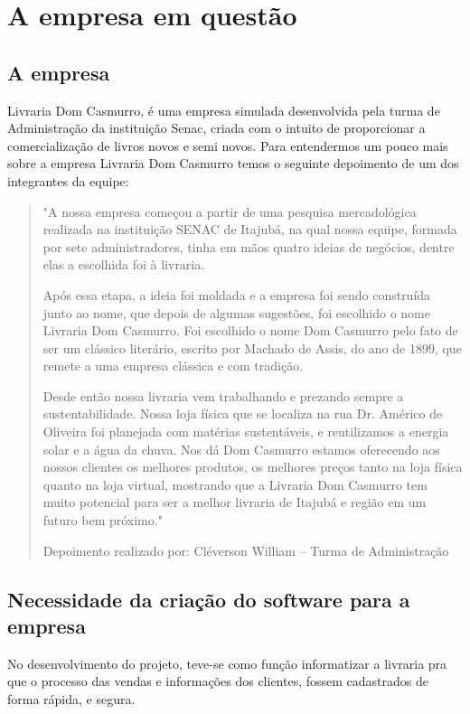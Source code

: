 \chapter{A empresa em questão}

\section{A empresa}

	Livraria Dom Casmurro, é uma empresa simulada desenvolvida pela turma de Administração da instituição Senac, criada com o intuito de proporcionar a comercialização de livros novos e semi novos.
	Para entendermos um pouco mais sobre a empresa Livraria Dom Casmurro temos o seguinte depoimento de um dos integrantes da equipe:

\begin{quote}
	"A nossa empresa começou a partir de uma pesquisa mercadológica realizada na instituição SENAC de Itajubá, na qual nossa equipe, formada por sete administradores, tinha em mãos quatro ideias de negócios, dentre elas a escolhida foi à livraria. 

Após essa etapa, a ideia foi moldada e a empresa foi sendo construída junto ao nome, que depois de algumas sugestões, foi escolhido o nome Livraria Dom Casmurro. Foi escolhido o nome Dom Casmurro pelo fato de ser um clássico literário, escrito por Machado de Assis, do ano de 1899, que remete a uma empresa clássica e com tradição. 

Desde então nossa livraria vem trabalhando e prezando sempre a sustentabilidade. Nossa loja física que se localiza na rua Dr. Américo de Oliveira foi planejada com matérias sustentáveis, e reutilizamos a energia solar e a água da chuva. 
Nos dá Dom Casmurro estamos oferecendo aos nossos clientes os melhores produtos, os melhores preços tanto na loja física quanto na loja virtual, mostrando que a Livraria Dom Casmurro tem muito potencial para ser a melhor livraria de Itajubá e região em um futuro bem próximo."


\raggedleft
Depoimento realizado por: Cléverson William – Turma de Administração
\end{quote}



\section{Necessidade da criação do software para a empresa}

	No desenvolvimento do projeto, teve-se como função informatizar a livraria pra que o processo das vendas e informações dos clientes, fossem cadastrados de forma rápida, e segura.
	
